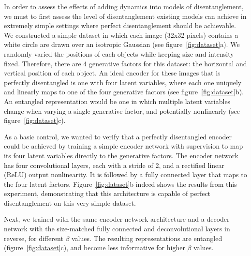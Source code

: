\documentclass[10pt,letterpaper]{article}
\begin{document}
In order to assess the effects of adding dynamics into models of disentanglement, we must to first assess the level of disentanglement existing models can achieve in extremely simple settings where perfect disentanglement should be achievable. We constructed a simple dataset in which each image (32x32 pixels) contains a white circle are drawn over an isotropic Gaussian (see figure~\ref{fig:dataset}a). We randomly varied the positions of each objects while keeping size and intensity fixed. Therefore, there are 4 generative factors for this dataset: the horizontal and vertical position of each object. An ideal encoder for these images that is perfectly disentangled is one with four latent variables, where %
each one uniquely and linearly maps to one of the four generative factors (see figure~\ref{fig:dataset}b). An entangled representation would be one in which multiple latent variables change when varying a single generative factor, and potentially nonlinearly (see figure~\ref{fig:dataset}c).

As a basic control, we wanted to verify that a perfectly disentangled encoder could be achieved by training a simple encoder network with supervision to map its four latent variables directly to the generative factors. The encoder network has four convolutional layers, each with a stride of 2, and a rectified linear (ReLU) output nonlinearity. It is followed by a fully connected layer that maps to the four latent factors. Figure~\ref{fig:dataset}b indeed shows the results from this experiment, demonstrating that this architecture is capable of perfect disentanglement on this very simple dataset.

Next, we trained \bvaes with the same encoder network architecture and a decoder network with the size-matched fully connected and deconvolutional layers in reverse, for different $\beta$ values. The resulting representations are entangled (figure~\ref{fig:dataset}c), and become less informative for higher $\beta$ values.
\end{document}
